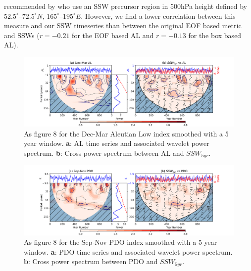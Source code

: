 recommended by \cite{garfinkelWhy2012} who use an SSW precursor region in 500hPa height defined by $52.5^{\circ}$–$72.5^{\circ}N$, $165^{\circ}$–$195^{\circ}E$. However, we find a lower correlation between this measure and our SSW timeseries than between the original EOF based metric and SSWs ($r = -0.21$ for the EOF based AL and $r = -0.13$ for the box based AL).


\begin{figure}[h!]
\begin{center}
\includegraphics[width = \linewidth]{Figures/Figures-origins/AL_wavelet_combined.png}
\caption{As figure 8 for the Dec-Mar Aleutian Low index smoothed with a 5 year window. \textbf{a}: AL time series and associated wavelet power spectrum. \textbf{b}: Cross power spectrum between AL and $SSW_{5yr}$.}
\label{fig:AL_wavelet}
\end{center}
\end{figure}

\begin{figure}[h!]
\begin{center}
\includegraphics[width = \linewidth]{Figures/Figures-origins/PDO_wavelet_combined.png}
\caption{As figure 8 for the Sep-Nov PDO index smoothed with a 5 year window. \textbf{a}: PDO time series and associated wavelet power spectrum. \textbf{b}: Cross power spectrum between PDO and $SSW_{5yr}$.}
\label{fig:PDO_wavelet}
\end{center}
\end{figure}


